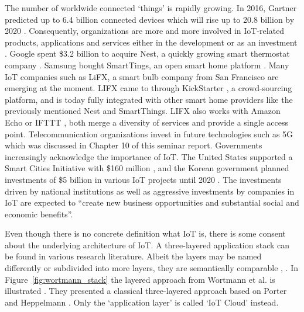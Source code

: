 	The number of worldwide connected `things' is rapidly growing. In 2016, Gartner predicted up to 6.4 billion connected devices which will rise up to 20.8 billion by 2020 \cite{gartner}. Consequently, organizations are more and more involved in IoT-related products, applications and services either in the development or as an investment \cite{ju}. Google spent \$3.2 billion to acquire Nest, a quickly growing smart thermostat company \cite{tilley_nest}. Samsung bought SmartTings, an open smart home platform \cite{tilley_smart}. Many IoT companies such as LiFX, a smart bulb company from San Francisco are emerging at the moment. LIFX came to through KickStarter \cite{kickstart}, a crowd-sourcing platform, and is today fully integrated with other smart home providers like the previously mentioned Nest and SmartThings. LIFX also works with Amazon Echo \cite{echo} or IFTTT \cite{ifttt}, both merge a diversity of services and provide a single access point. Telecommunication organizations invest in future technologies such as 5G which was discussed in Chapter 10 of this seminar report. Governments increasingly acknowledge the importance of IoT. The United States supported a Smart Cities Initiative with \$160 million \cite{miller}, and the Korean government planned investments of \$5 billion in various IoT projects until 2020 \cite{cho}. The investments driven by national institutions as well as aggressive investments by companies in IoT are expected to ``create new business opportunities and substantial social and economic benefits''\cite{ju}. 

	Even though there is no concrete definition what IoT is, there is some consent about the underlying architecture of IoT. A three-layered application stack can be found in various research literature. Albeit the layers may be named differently or subdivided into more layers, they are semantically comparable \cite{fleisch} \cite{ju}, \cite{wortmann}. In Figure~\ref{fig:wortmann_stack} the layered approach from Wortmann et al. is illustrated \cite{wortmann}. They presented a classical three-layered approach based on Porter and Heppelmann \cite{port_hepp}. Only the `application layer' is called `IoT Cloud' instead.

